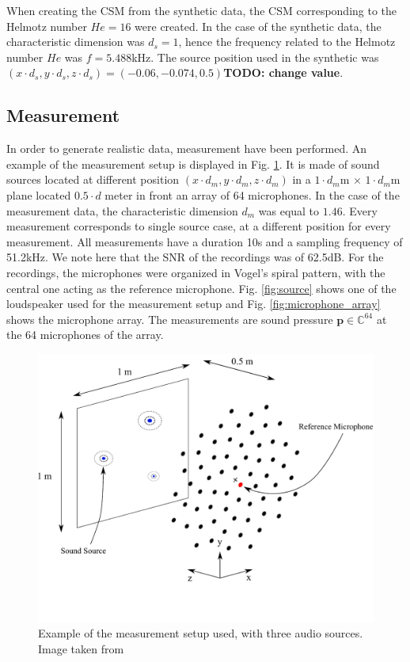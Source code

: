 \documentclass[11pt,a4paper,twoside]{report}
\begin{document}
When creating the CSM from the synthetic data, the CSM corresponding to the Helmotz number $He = 16$ were created. In the case of the synthetic data, the characteristic dimension was $d_s = 1$, hence the frequency related to the Helmotz number $He$ was $f = 5.488$kHz. The source position used in the synthetic was $(x \cdot d_s,y \cdot d_s, z \cdot d_s) = (-0.06,-0.074, 0.5)$\textbf{TODO: change value}. 

\subsection{Measurement}

In order to generate realistic data, measurement have been performed. An example of the measurement setup is displayed in Fig. \ref{fig:full_measurement_setup}. It is made of sound sources located at different position $(x \cdot d_m,y \cdot d_m, z \cdot d_m)$ in a $1 \cdot d_m$m $\times$ $1 \cdot d_m$m plane located $0.5 \cdot d$ meter in front an array of 64 microphones. In the case of the measurement data, the characteristic dimension $d_m$ was equal to $1.46$. Every measurement corresponds to single source case, at a different position for every measurement. All measurements have a duration 10s and a sampling frequency of 51.2kHz. We note here that the SNR of the recordings was of 62.5dB. For the recordings, the microphones were organized in Vogel's spiral pattern, with the central one acting as the reference microphone.  Fig. \ref{fig:source} shows one of the loudspeaker used  for the measurement setup and Fig. \ref{fig:microphone_array} shows the microphone array. The measurements are sound pressure $\mathbf{p} \in \mathbb{C}^{64}$ at the 64 microphones of the array.

\begin{figure}
    \centering
    \includegraphics[width=1\textwidth]{figs/full_measurement_setup.pdf}
    \caption{Example of the measurement setup used, with three audio sources. Image taken from \cite{kujawski2022acoupipe}}
    \label{fig:full_measurement_setup}
\end{figure} 
\end{document}
